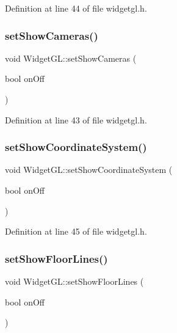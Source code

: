 Definition at line 44 of file widgetgl.\+h.

\mbox{\label{class_widget_g_l_aaad4de1276e8e61299dce965e02bbe85}} 
\subsubsection{\texorpdfstring{setShowCameras()}{setShowCameras()}}
{\footnotesize\ttfamily void Widget\+G\+L\+::set\+Show\+Cameras (\begin{DoxyParamCaption}\item[{bool}]{on\+Off }\end{DoxyParamCaption})\hspace{0.3cm}{\ttfamily [inline]}}



Definition at line 43 of file widgetgl.\+h.

\mbox{\label{class_widget_g_l_a3bf99999fad0c38517d9b3d31ee0655b}} 
\subsubsection{\texorpdfstring{setShowCoordinateSystem()}{setShowCoordinateSystem()}}
{\footnotesize\ttfamily void Widget\+G\+L\+::set\+Show\+Coordinate\+System (\begin{DoxyParamCaption}\item[{bool}]{on\+Off }\end{DoxyParamCaption})\hspace{0.3cm}{\ttfamily [inline]}}



Definition at line 45 of file widgetgl.\+h.

\mbox{\label{class_widget_g_l_ac424900b947bde6a1d42776ab12eacd3}} 
\subsubsection{\texorpdfstring{setShowFloorLines()}{setShowFloorLines()}}
{\footnotesize\ttfamily void Widget\+G\+L\+::set\+Show\+Floor\+Lines (\begin{DoxyParamCaption}\item[{bool}]{on\+Off }\end{DoxyParamCaption})\hspace{0.3cm}{\ttfamily [inline]}}



